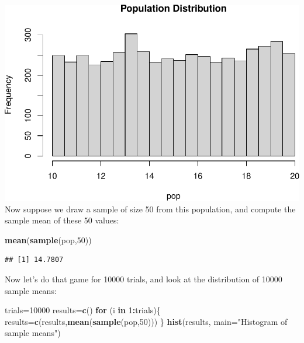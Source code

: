 \documentclass[
]{book}
\newenvironment{Shaded}{\begin{snugshade}}{\end{snugshade}}
\newcommand{\AttributeTok}[1]{\textcolor[rgb]{0.13,0.29,0.53}{#1}}
\newcommand{\ControlFlowTok}[1]{\textcolor[rgb]{0.13,0.29,0.53}{\textbf{#1}}}
\newcommand{\DecValTok}[1]{\textcolor[rgb]{0.00,0.00,0.81}{#1}}
\newcommand{\FunctionTok}[1]{\textcolor[rgb]{0.13,0.29,0.53}{\textbf{#1}}}
\newcommand{\NormalTok}[1]{#1}
\newcommand{\OtherTok}[1]{\textcolor[rgb]{0.56,0.35,0.01}{#1}}
\newcommand{\SpecialCharTok}[1]{\textcolor[rgb]{0.81,0.36,0.00}{\textbf{#1}}}
\newcommand{\StringTok}[1]{\textcolor[rgb]{0.31,0.60,0.02}{#1}}
\theoremstyle{definition}
\theoremstyle{definition}
\theoremstyle{definition}
\theoremstyle{definition}
\theoremstyle{remark}
\begin{document}
\includegraphics{math340-notes_files/figure-latex/unnamed-chunk-173-1.pdf}
Now suppose we draw a sample of size 50 from this population, and compute the sample mean of these 50 values:

\begin{Shaded}
\begin{Highlighting}[]
\FunctionTok{mean}\NormalTok{(}\FunctionTok{sample}\NormalTok{(pop,}\DecValTok{50}\NormalTok{))}
\end{Highlighting}
\end{Shaded}

\begin{verbatim}
## [1] 14.7807
\end{verbatim}

Now let's do that game for 10000 trials, and look at the distribution of 10000 sample means:

\begin{Shaded}
\begin{Highlighting}[]
\NormalTok{trials}\OtherTok{=}\DecValTok{10000}
\NormalTok{results}\OtherTok{=}\FunctionTok{c}\NormalTok{()}
\ControlFlowTok{for}\NormalTok{ (i }\ControlFlowTok{in} \DecValTok{1}\SpecialCharTok{:}\NormalTok{trials)\{}
\NormalTok{  results}\OtherTok{=}\FunctionTok{c}\NormalTok{(results,}\FunctionTok{mean}\NormalTok{(}\FunctionTok{sample}\NormalTok{(pop,}\DecValTok{50}\NormalTok{)))}
\NormalTok{\}}
\FunctionTok{hist}\NormalTok{(results, }\AttributeTok{main=}\StringTok{"Histogram of sample means"}\NormalTok{)}
\end{Highlighting}
\end{Shaded}
\end{document}
